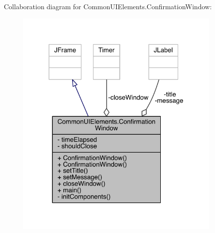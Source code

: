 Collaboration diagram for Common\+U\+I\+Elements.\+Confirmation\+Window\+:
\nopagebreak
\begin{figure}[H]
\begin{center}
\leavevmode
\includegraphics[width=288pt]{classCommonUIElements_1_1ConfirmationWindow__coll__graph}
\end{center}
\end{figure}
